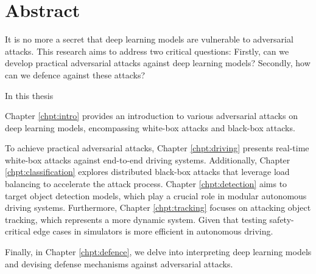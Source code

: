 \chapter*{Abstract}

It is no more a secret that deep learning models are vulnerable to adversarial attacks. This research aims to address two critical questions: Firstly, can we develop practical adversarial attacks against deep learning models? Secondly, how can we defence against these attacks?

In this thesis

Chapter \ref{chpt:intro} provides an introduction to various adversarial attacks on deep learning models, encompassing white-box attacks and black-box attacks.

To achieve practical adversarial attacks, Chapter \ref{chpt:driving} presents real-time white-box attacks against end-to-end driving systems. Additionally, Chapter \ref{chpt:classification} explores distributed black-box attacks that leverage load balancing to accelerate the attack process. Chapter \ref{chpt:detection} aims to target object detection models, which play a crucial role in modular autonomous driving systems. Furthermore, Chapter \ref{chpt:tracking} focuses on attacking object tracking, which represents a more dynamic system. Given that testing safety-critical edge cases in simulators is more efficient in autonomous driving.

Finally, in Chapter \ref{chpt:defence}, we delve into interpreting deep learning models and devising defense mechanisms against adversarial attacks.
